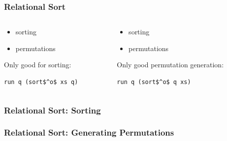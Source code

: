 \documentclass[xcolor=table, aspectratio=169]{beamer}
\newcommand{\happyCheck}{\color{green}{\checkmark}}
\newcommand{\sadCross}{\color{red}{$\times$}}
\begin{document}
\begin{frame}[fragile]
  \frametitle{Relational Sort}
\begin{columns}
  \begin{column}[t]{0.49\textwidth}
    

    \vfill

    \begin{center}
      \begin{itemize}
        \item[\happyCheck] sorting
        \item[\sadCross] permutations
      \end{itemize}
      Only good for sorting:

      \lstinline{run q (sort$^o$ xs q)}
    \end{center}

  \end{column}
  \begin{column}[t]{0.49\textwidth}
    

    \vfill

    \begin{center}
      \begin{itemize}
        \item[\sadCross] sorting
        \item[\happyCheck] permutations
      \end{itemize}
      Only good permutation generation:

      \lstinline{run q (sort$^o$ q xs)}
    \end{center}


  \end{column}
\end{columns}
\end{frame}

\begin{frame}[fragile]
  \frametitle{Relational Sort: Sorting}
    
\end{frame}


\begin{frame}[fragile]
  \frametitle{Relational Sort: Generating Permutations}
    
\end{frame}
\end{document}
